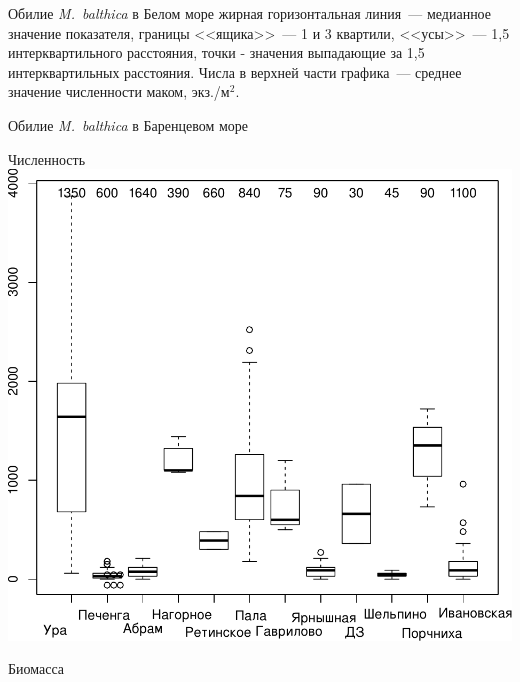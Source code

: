 \documentclass{beamer}
\begin{document}
\begin{frame}{Обилие {\it M.~balthica} в Белом море}
{\tiny жирная горизонтальная линия~--- медианное значение показателя, 
границы <<ящика>>~--- 1 и 3 квартили, <<усы>>~--- 1,5 интерквартильного расстояния, 
точки - значения выпадающие за 1,5 интерквартильных расстояния. 
Числа в верхней части графика~--- среднее значение численности маком, экз./м$^2$.}

\end{frame}



\begin{frame}{Обилие {\it M.~balthica} в Баренцевом море}
	\begin{minipage}[t]{.49\linewidth}
		\begin{center}
		{\footnotesize Численность}
			\includegraphics[width=\textwidth]{N2_area_Barents1.pdf}
		\end{center}
	\end{minipage}
%
	\begin{minipage}[t]{.49\linewidth}
		\begin{center}
		{\footnotesize Биомасса}

\end{center}
\end{minipage}
\end{frame}
\end{document}
